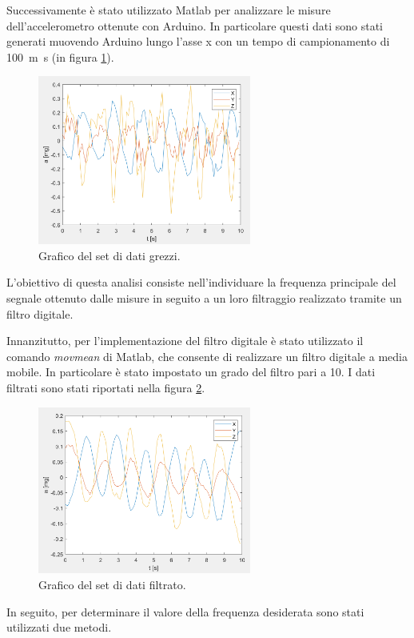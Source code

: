 Successivamente è stato utilizzato Matlab per analizzare le misure dell'accelerometro ottenute con Arduino. In particolare questi dati sono stati generati muovendo Arduino lungo l'asse x con un tempo di campionamento di \SI{100}{m\second} (in figura \ref{fig:plot_dati}).
\begin{figure}[tbh]
	\centering		\includegraphics[width=7cm]{./ImageFiles/plot1_arr2.png}
	\caption{Grafico del set di dati grezzi.}
	\label{fig:plot_dati}
\end{figure}

L'obiettivo di questa analisi consiste nell'individuare la frequenza principale del segnale ottenuto dalle misure in seguito a un loro filtraggio realizzato tramite un filtro digitale.

Innanzitutto, per l'implementazione del filtro digitale è stato utilizzato il comando \textit{movmean} di Matlab, che consente di realizzare un filtro digitale a media mobile. In particolare è stato impostato un grado del filtro pari a 10. I dati filtrati sono stati riportati nella figura \ref{fig:plot_dati_filt}.
\begin{figure}[tbh]
	\centering		\includegraphics[width=7cm]{./ImageFiles/plot1filt_arr2.png}
	\caption{Grafico del set di dati filtrato.}
	\label{fig:plot_dati_filt}
\end{figure}

In seguito, per determinare il valore della frequenza desiderata sono stati utilizzati due metodi.

